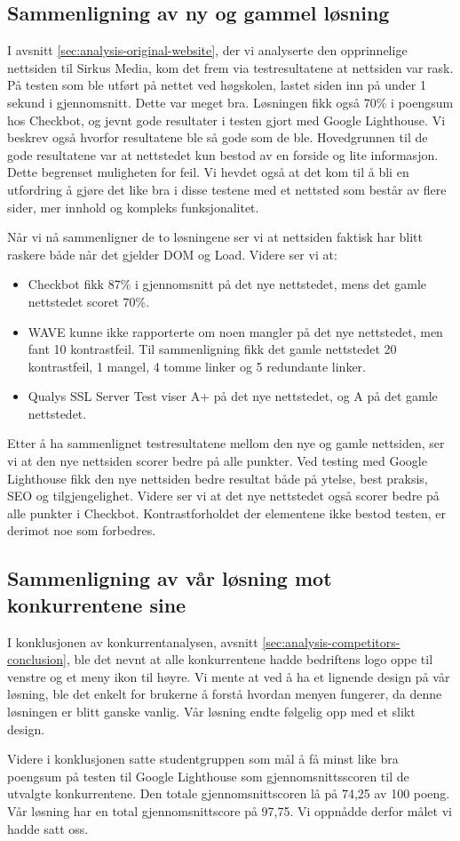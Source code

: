 \subsection{Sammenligning av ny og gammel løsning}
I avsnitt \ref{sec:analysis-original-website}, der vi analyserte den opprinnelige nettsiden til Sirkus Media, kom det frem via testresultatene at nettsiden var rask. På testen som ble utført på nettet ved høgskolen, lastet siden inn på under 1 sekund i gjennomsnitt. Dette var meget bra. Løsningen fikk også 70\% i poengsum hos Checkbot, og jevnt gode resultater i testen gjort med Google Lighthouse. Vi beskrev også hvorfor resultatene ble så gode som de ble. Hovedgrunnen til de gode resultatene var at nettstedet kun bestod av en forside og lite informasjon. Dette begrenset muligheten for feil. Vi hevdet også at det kom til å bli en utfordring å gjøre det like bra i disse testene med et nettsted som består av flere sider, mer innhold og kompleks funksjonalitet.

Når vi nå sammenligner de to løsningene ser vi at nettsiden faktisk har blitt raskere både når det gjelder DOM og Load. Videre ser vi at:

\begin{itemize}
    \item Checkbot fikk 87\% i gjennomsnitt på det nye nettstedet, mens det gamle nettstedet scoret 70\%. 
    \item WAVE kunne ikke rapporterte om noen mangler på det nye nettstedet, men fant 10 kontrastfeil. Til sammenligning fikk det gamle nettstedet 20 kontrastfeil, 1 mangel, 4 tomme linker og 5 redundante linker.
    \item Qualys SSL Server Test viser A+ på det nye nettstedet, og A på det gamle nettstedet.
\end{itemize}

Etter å ha sammenlignet testresultatene mellom den nye og gamle nettsiden, ser vi at den nye nettsiden scorer bedre på alle punkter. Ved testing med Google Lighthouse fikk den nye nettsiden bedre resultat både på ytelse, best praksis, SEO og tilgjengelighet. Videre ser vi at det nye nettstedet også scorer bedre på alle punkter i Checkbot. Kontrastforholdet der elementene ikke bestod testen, er derimot noe som forbedres.

\subsection{Sammenligning av vår løsning mot konkurrentene sine}
I konklusjonen av konkurrentanalysen, avsnitt \ref{sec:analysis-competitors-conclusion}, ble det nevnt at alle konkurrentene hadde bedriftens logo oppe til venstre og et meny ikon til høyre. Vi mente at ved å ha et lignende design på vår løsning, ble det enkelt for brukerne å forstå hvordan menyen fungerer, da denne løsningen er blitt ganske vanlig. Vår løsning endte følgelig opp med et slikt design.

Videre i konklusjonen satte studentgruppen som mål å få minst like bra poengsum på testen til Google Lighthouse som gjennomsnittsscoren til de utvalgte konkurrentene. Den totale gjennomsnittscoren lå på 74,25 av 100 poeng. Vår løsning har en total gjennomsnittscore på 97,75. Vi oppnådde derfor målet vi hadde satt oss.